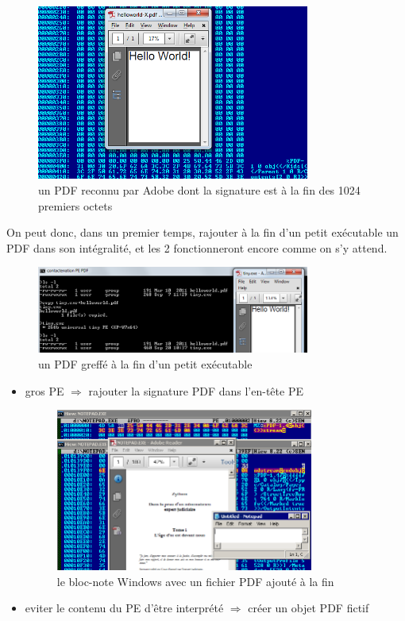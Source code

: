 \begin{figure}[ht]
  \centering
  \includegraphics[width=0.8\textwidth]{albertini/img/pdfsigpractice}
  \caption{un PDF reconnu par Adobe dont la signature est à la fin des 1024 premiers octets}
  \label{fig:albertini:pdfsigpractice}
\end{figure}

On peut donc, dans un premier temps, rajouter à la fin d'un petit exécutable un PDF dans son intégralité, et les 2 fonctionneront encore comme on s'y attend.

\begin{figure}[ht]
  \centering
  \includegraphics[width=0.8\textwidth]{albertini/img/tinyPEPDF}
  \caption{un PDF greffé à la fin d'un petit exécutable}
  \label{fig:albertini:tinyPEPDF}
\end{figure}

\begin{itemize}
\item gros PE $\Rightarrow$ rajouter la signature PDF dans l'en-tête PE

\begin{figure}[ht]
  \centering
  \includegraphics[width=0.8\textwidth]{albertini/img/pdfnotepad}
  \caption{le bloc-note Windows avec un fichier PDF ajouté à la fin}
  \label{fig:albertini:pythonnotepad}
\end{figure}


\item eviter le contenu du PE d'être interprété $\Rightarrow$ créer un objet PDF fictif
\end{itemize}

